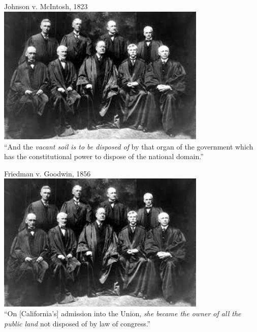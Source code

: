 \begin{frame}{Johnson v. McIntosh, 1823}
    \centering
    \includegraphics[width=0.75\textwidth]{img/sc-1905.png} \\
    ``And the \emph{vacant soil is to be disposed of} by that organ of the government which has the constitutional power to dispose of the national domain.'' \\
\end{frame}

\begin{frame}{Friedman v. Goodwin, 1856}
    \centering
    \includegraphics[width=0.75\textwidth]{img/sc-1905.png} \\
    ``On [California's] admission into the Union, \emph{she became the owner of all the public land} not disposed of by law of congress.'' \\
\end{frame}

